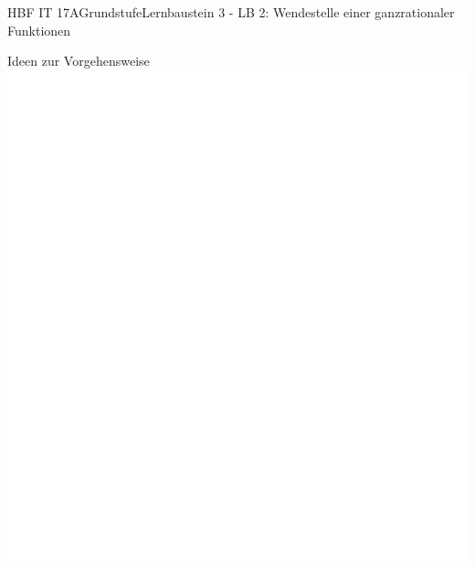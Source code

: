 \documentclass[oneside,openany,headings=optiontotoc,11pt,numbers=noenddot]{scrreprt}
\begin{document}
\begin{worksheet}{HBF IT 17A}{Grundstufe}{Lernbaustein 3 - LB 2: Wendestelle einer ganzrationaler Funktionen}
		\begin{framed}
			\noindent
			\tiny{\color{codegray}Ideen zur Vorgehensweise}\\
			\includegraphics[scale=0.6]{../empty.jpg}
		\end{framed}
	\end{worksheet}
\end{document}
